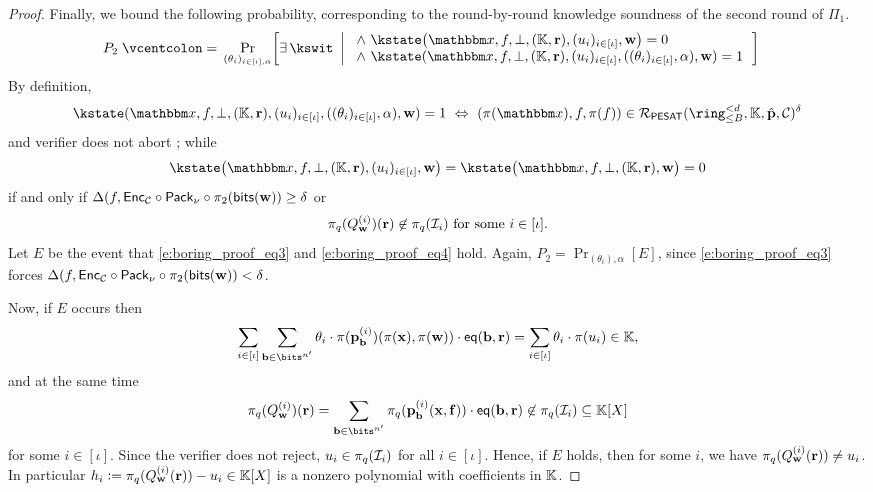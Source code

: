 \documentclass[11pt,letterpaper,usenames,dvipsnames]{article}
\begin{document}
\begin{proof}
Finally, we bound the following probability, corresponding to the round-by-round knowledge soundness of the second round of $\Pi_1$.
\begin{align*}
  P_2\defeq &\Pr_{(\theta_i)_{i\in[\iota], \alpha}}\!\left[
  \exists\,\kswit \ \left| \ \begin{array}{l}
  \wedge\ \kstate\bigl(\inp,f,\bot,(\KK,\rr), (u_i)_{i\in[\iota]},\ww\bigr)=0\\
  \wedge\ \kstate(\inp,f, \bot,(\KK,\rr),(u_i)_{i\in [\iota]},((\theta_i)_{i\in[\iota]},\alpha), \ww)=1
  \end{array}
  \right.\right] 
\end{align*}
%
By definition, \begin{equation}\label{e:boring_proof_eq3}\kstate(\inp,f, \bot,(\KK,\rr),(u_i)_{i\in [\iota]},((\theta_i)_{i\in[\iota]},\alpha), \ww)=1 \ \Leftrightarrow \ (\pi(\inp), f, \pi(f))\in \PESAT(\ringtwobounds{B}{\moduledegree}, \KK, \hat{\pp}, \cC)^\delta\end{equation} and verifier does not abort ; while $$\kstate\bigl(\inp,f,\bot,(\KK,\rr), (u_i)_{i\in[\iota]},\ww\bigr)=\kstate\bigl(\inp,f,\bot,(\KK,\rr),\ww\bigr)=0$$  if and only if 
$\Delta(f,\mathsf{Enc}_{\mathcal{C}}\circ \mathsf{Pack}_\nu \circ \pi_2(\mathsf{bits}(\mathbf{w})) \geq \delta$ or \begin{equation}\label{e:boring_proof_eq4}\pi_q(Q_{\mathbf{w}}^{(i)})(\mathbf{r})\not\in \pi_q(\mathcal{I}_i) \text{ for some } i\in [\iota].\end{equation}  
%
Let $E$ be the event that  \eqref{e:boring_proof_eq3} and \eqref{e:boring_proof_eq4} hold. Again, $P_2= \Pr_{(\theta_i),\alpha}[E]$, since \eqref{e:boring_proof_eq3} forces $\Delta(f,\mathsf{Enc}_{\mathcal{C}}\circ \mathsf{Pack}_\nu \circ \pi_2(\mathsf{bits}(\mathbf{w})) < \delta$.

Now, if $E$ occurs then
$$
\sum_{i\in [\iota]}\sum_{\bb\in \bits^{n'}}\theta_i\cdot \pi(\pp_\bb^{(i)})(\pi(\xx),\pi(\ww)) \cdot \eq(\bb, \rr) = \sum_{i\in [\iota]} \theta_i \cdot \pi(u_i) \in \KK,
$$
and at the same time 
$$
\pi_q(Q_{\ww}^{(i)})(\rr) = \sum_{\bb\in\bits^{n'}}\pi_q(\pp_{\bb}^{(i)}(\xx,\bff)) \cdot \eq(\bb,\rr) \not\in \pi_q(\ideal_i)\subseteq \KK[X]
$$
 for some $i\in [\iota]$. Since the verifier does not reject, $u_i \in \pi_q(\mathcal{I}_i)$ for all $i\in [\iota]$. Hence, if $E$ holds, then for some $i$, we have $\pi_q(Q_{\mathbf{w}}^{(i)}(\mathbf{r})) \neq u_i$. In particular $h_i {\;\vcentcolon=\;} \pi_q(Q_{\mathbf{w}}^{(i)}(\mathbf{r})) - u_i \in \mathbb{K}[X]$ is a nonzero polynomial with coefficients in $\mathbb{K}$.


\end{proof}
\end{document}
